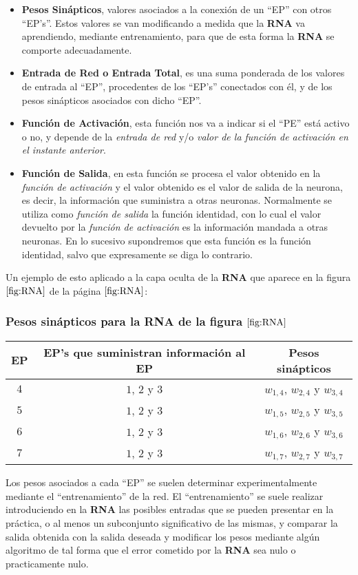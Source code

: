 \begin{itemize}
\item \textbf{Pesos Sin\'apticos}, valores asociados a la conexi\'on de un
``EP'' con otros ``EP's''. Estos valores se van modificando a medida que la
\textbf{RNA} va aprendiendo, mediante entrenamiento, para que de esta forma la
\textbf{RNA} se comporte adecuadamente.
\item \textbf{Entrada de Red o Entrada Total}, es una suma ponderada de los
valores de entrada al ``EP'', procedentes de los ``EP's'' conectados con \'el,
y de los pesos sin\'apticos asociados con dicho ``EP''.
\item \textbf{Funci\'on de Activaci\'on}, esta funci\'on nos va a indicar si el
``PE'' est\'a activo o no, y depende de la \emph{entrada de red} y/o \emph{valor
de la funci\'on de activaci\'on en el instante anterior}.
\item \textbf{Funci\'on de Salida}, en esta funci\'on se procesa el valor
obtenido en la \emph{funci\'on de activaci\'on} y el valor obtenido es el valor
de salida de la neurona, es decir, la informaci\'on que suministra a otras
neuronas. Normalmente se utiliza como \emph{funci\'on de salida} la funci\'on
identidad, con lo cual el valor devuelto por la \emph{funci\'on de activaci\'on}
es la informaci\'on mandada a otras neuronas. En lo sucesivo supondremos que
esta funci\'on es la funci\'on identidad, salvo que expresamente se diga lo
contrario.
\end{itemize}
Un ejemplo de esto aplicado a la capa oculta de la \textbf{RNA} que aparece en
la figura $\ref{fig:RNA}$ de la p\'agina $\pageref{fig:RNA}$:

\subsubsection{Pesos sin\'apticos para la RNA de la figura $\ref{fig:RNA}$}
\begin{center}
\begin{tabular}{|c|c|c|}
\hline
EP&EP's que suministran informaci\'on al EP &Pesos sin\'apticos\\
\hline
$4$&$1$, $2$ y $3$& $w_{1,4}$, $w_{2,4}$ y $w_{3,4}$\\
\hline
$5$&$1$, $2$ y $3$& $w_{1,5}$, $w_{2,5}$ y $w_{3,5}$\\
\hline
$6$&$1$, $2$ y $3$& $w_{1,6}$, $w_{2,6}$ y $w_{3,6}$\\
\hline
$7$&$1$, $2$ y $3$& $w_{1,7}$, $w_{2,7}$ y $w_{3,7}$\\
\hline
\end{tabular}
\end{center}
Los pesos asociados a cada ``EP'' se suelen determinar experimentalmente
mediante el ``entrenamiento'' de la red. El ``entrenamiento'' se suele realizar
introduciendo en la \textbf{RNA} las posibles entradas que se pueden presentar 
en la pr\'actica, o al menos un subconjunto significativo de las mismas, y
comparar la salida obtenida con la salida deseada y modificar los pesos mediante
alg\'un algoritmo de tal forma que el error cometido por la \textbf{RNA} sea
nulo o practicamente nulo.

